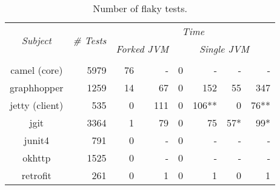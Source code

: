 \begin{table*}[t]
  \centering
  \begin{tabular}{|c|r|r|r|r|r|r|r|}
    \hline
    \multirow{2}{*}{\emph{Subject}} & \multirow{2}{*}{\emph{\# Tests}} &  \multicolumn{6}{c|}{\emph{Time}}\\
    \cline{3-8}
    & & \multicolumn{2}{c|}{\emph{Forked JVM}} & \multicolumn{4}{c|}{\emph{Single JVM}}   \\
    \cline{3-8}
    & & \multicolumn{1}{c|}{\Seq{}} & \multicolumn{1}{c|}{\ParClassSeqMeth{}} & \multicolumn{1}{c|}{\Seq{}} & \multicolumn{1}{c|}{\ParClassSeqMeth{}} & \multicolumn{1}{c|}{\SeqClassParMeth{}} & \multicolumn{1}{c|}{\ParClassParMeth{}}\\     \hline 
    camel (core) & 5979 & 76 & - & 0 & - & - & - \\
    \hline
    graphhopper & 1259 & 14 & 67 & 0 & 152 & 55 & 347 \\
    \hline
    jetty (client) & 535 & 0 & 111 & 0 & 106** & 0 & 76** \\
    \hline
    jgit & 3364 & 1 & 79 & 0 & 75 & 57* & 99* \\
    \hline
    junit4 & 791 & 0 & - & 0 & - & - & - \\
    \hline
    okhttp & 1525 & 0 & - & 0 & - & - & - \\
    \hline
    retrofit & 261 & 0 & 1 & 0 & 1 & 0 & 1 \\
    \hline
  \end{tabular}
  \caption{\label{table:failures}Number of flaky tests.}
\end{table*}

